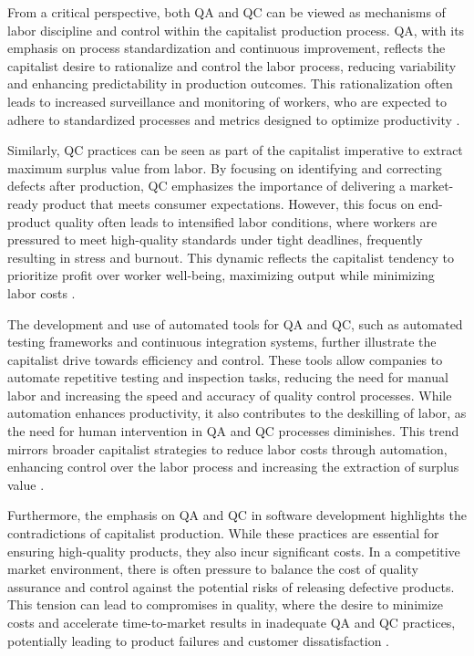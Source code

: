 \begin{refsection}
From a critical perspective, both QA and QC can be viewed as mechanisms of labor discipline and control within the capitalist production process. QA, with its emphasis on process standardization and continuous improvement, reflects the capitalist desire to rationalize and control the labor process, reducing variability and enhancing predictability in production outcomes. This rationalization often leads to increased surveillance and monitoring of workers, who are expected to adhere to standardized processes and metrics designed to optimize productivity \cite[pp.~88-92]{braverman1974labor}.

Similarly, QC practices can be seen as part of the capitalist imperative to extract maximum surplus value from labor. By focusing on identifying and correcting defects after production, QC emphasizes the importance of delivering a market-ready product that meets consumer expectations. However, this focus on end-product quality often leads to intensified labor conditions, where workers are pressured to meet high-quality standards under tight deadlines, frequently resulting in stress and burnout. This dynamic reflects the capitalist tendency to prioritize profit over worker well-being, maximizing output while minimizing labor costs \cite[pp.~152-157]{marx2008capital}.

The development and use of automated tools for QA and QC, such as automated testing frameworks and continuous integration systems, further illustrate the capitalist drive towards efficiency and control. These tools allow companies to automate repetitive testing and inspection tasks, reducing the need for manual labor and increasing the speed and accuracy of quality control processes. While automation enhances productivity, it also contributes to the deskilling of labor, as the need for human intervention in QA and QC processes diminishes. This trend mirrors broader capitalist strategies to reduce labor costs through automation, enhancing control over the labor process and increasing the extraction of surplus value \cite[pp.~490-499]{marx2008capital}.

Furthermore, the emphasis on QA and QC in software development highlights the contradictions of capitalist production. While these practices are essential for ensuring high-quality products, they also incur significant costs. In a competitive market environment, there is often pressure to balance the cost of quality assurance and control against the potential risks of releasing defective products. This tension can lead to compromises in quality, where the desire to minimize costs and accelerate time-to-market results in inadequate QA and QC practices, potentially leading to product failures and customer dissatisfaction \cite[pp.~120-125]{garvin1984managing}.


\end{refsection}
